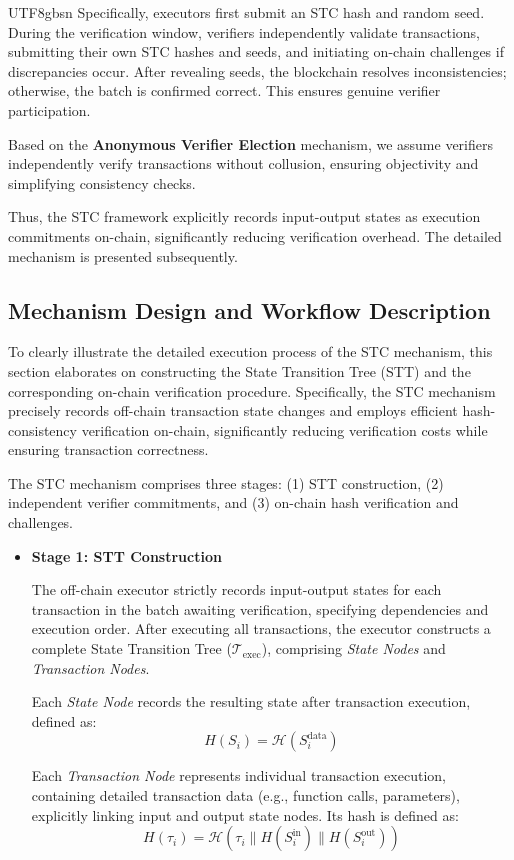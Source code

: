 \documentclass[runningheads]{llncs}
\begin{document}
\begin{CJK*}{UTF8}{gbsn}
Specifically, executors first submit an STC hash and random seed. During the verification window, verifiers independently validate transactions, submitting their own STC hashes and seeds, and initiating on-chain challenges if discrepancies occur. After revealing seeds, the blockchain resolves inconsistencies; otherwise, the batch is confirmed correct. This ensures genuine verifier participation.

Based on the \textbf{Anonymous Verifier Election} mechanism, we assume verifiers independently verify transactions without collusion, ensuring objectivity and simplifying consistency checks.

Thus, the STC framework explicitly records input-output states as execution commitments on-chain, significantly reducing verification overhead. The detailed mechanism is presented subsequently.

\subsection{Mechanism Design and Workflow Description}
To clearly illustrate the detailed execution process of the STC mechanism, this section elaborates on constructing the State Transition Tree (STT) and the corresponding on-chain verification procedure. Specifically, the STC mechanism precisely records off-chain transaction state changes and employs efficient hash-consistency verification on-chain, significantly reducing verification costs while ensuring transaction correctness.

The STC mechanism comprises three stages: (1) STT construction, (2) independent verifier commitments, and (3) on-chain hash verification and challenges.

\begin{itemize}
    \item \textbf{Stage 1: STT Construction}  

    The off-chain executor strictly records input-output states for each transaction in the batch awaiting verification, specifying dependencies and execution order. After executing all transactions, the executor constructs a complete State Transition Tree ($\mathcal{T}_{\text{exec}}$), comprising \textit{State Nodes} and \textit{Transaction Nodes}.  

    Each \textit{State Node} records the resulting state after transaction execution, defined as:
    \[
    H(S_i) = \mathcal{H}(S_i^{\text{data}})
    \]

    Each \textit{Transaction Node} represents individual transaction execution, containing detailed transaction data (e.g., function calls, parameters), explicitly linking input and output state nodes. Its hash is defined as:
    \[
    H(\tau_i) = \mathcal{H}(\tau_i \parallel H(S_i^{\text{in}}) \parallel H(S_i^{\text{out}}))
    \]


\end{itemize}
\end{CJK*}
\end{document}
